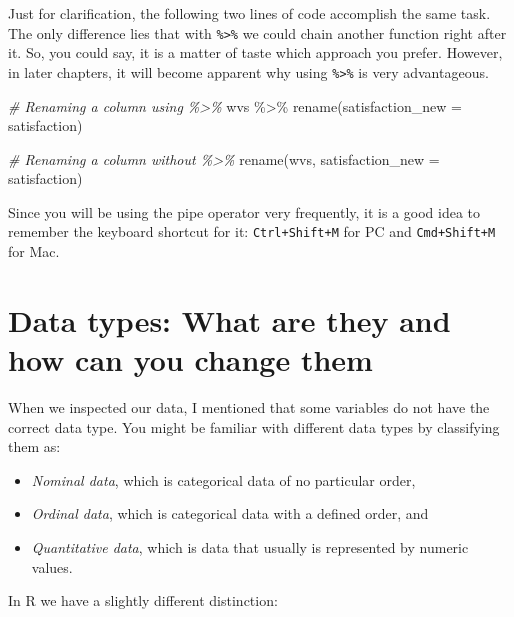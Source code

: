 \documentclass[
]{book}
\newenvironment{Shaded}{\begin{snugshade}}{\end{snugshade}}
\newcommand{\AttributeTok}[1]{\textcolor[rgb]{0.77,0.63,0.00}{#1}}
\newcommand{\CommentTok}[1]{\textcolor[rgb]{0.56,0.35,0.01}{\textit{#1}}}
\newcommand{\FunctionTok}[1]{\textcolor[rgb]{0.00,0.00,0.00}{#1}}
\newcommand{\NormalTok}[1]{#1}
\newcommand{\SpecialCharTok}[1]{\textcolor[rgb]{0.00,0.00,0.00}{#1}}
\begin{document}
Just for clarification, the following two lines of code accomplish the same task. The only difference lies that with \texttt{\%\textgreater{}\%} we could chain another function right after it. So, you could say, it is a matter of taste which approach you prefer. However, in later chapters, it will become apparent why using \texttt{\%\textgreater{}\%} is very advantageous.

\begin{Shaded}
\begin{Highlighting}[]
\CommentTok{\# Renaming a column using \textquotesingle{}\%\textgreater{}\%\textquotesingle{}}
\NormalTok{wvs }\SpecialCharTok{\%\textgreater{}\%} \FunctionTok{rename}\NormalTok{(}\AttributeTok{satisfaction\_new =}\NormalTok{ satisfaction)}

\CommentTok{\# Renaming a column without \textquotesingle{}\%\textgreater{}\%\textquotesingle{}}
\FunctionTok{rename}\NormalTok{(wvs, }\AttributeTok{satisfaction\_new =}\NormalTok{ satisfaction)}
\end{Highlighting}
\end{Shaded}

Since you will be using the pipe operator very frequently, it is a good idea to remember the keyboard shortcut for it: \texttt{Ctrl+Shift+M} for PC and \texttt{Cmd+Shift+M} for Mac.

\hypertarget{change-data-types}{%
\section{Data types: What are they and how can you change them}\label{change-data-types}}

When we inspected our data, I mentioned that some variables do not have the correct data type. You might be familiar with different data types by classifying them as:

\begin{itemize}
\item
  \emph{Nominal data}, which is categorical data of no particular order,
\item
  \emph{Ordinal data}, which is categorical data with a defined order, and
\item
  \emph{Quantitative data}, which is data that usually is represented by numeric values.
\end{itemize}

In R we have a slightly different distinction:
\end{document}

